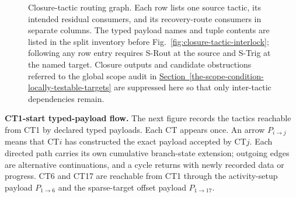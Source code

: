\documentclass[
  11pt,
]{article}
\theoremstyle{definition}
\newcommand{\secref}[1]{\hyperref[#1]{Section~\ref*{#1}}}
\begin{document}
\begin{figure}[p]
{%
}
\caption[Closure-tactic routing graph]{Closure-tactic routing graph.  Each row lists one source tactic, its intended residual consumers, and its recovery-route consumers in separate columns.  The typed payload names and tuple contents are listed in the split inventory before Fig.~\ref{fig:closure-tactic-interlock}; following any row entry requires S-Rout at the source and S-Trig at the named target.  Closure outputs and candidate obstructions referred to the global scope audit in \secref{the-scope-condition-locally-testable-targets} are suppressed here so that only inter-tactic dependencies remain.}
\label{fig:closure-tactic-routing-graph}
\end{figure}

\noindent\textbf{CT1-start typed-payload flow.}
The next figure records the tactics reachable from CT1 by declared
typed payloads.  Each CT appears once.  An arrow \(P_{i\to j}\) means
that CT\(i\) has constructed the exact payload accepted by CT\(j\).
Each directed path carries its own cumulative branch-state extension;
outgoing edges are alternative continuations, and a cycle returns with
newly recorded data or progress. CT6 and CT17 are reachable from
CT1 through the activity-setup payload \(P_{1\to6}\) and the sparse-target
offset payload \(P_{1\to17}\).
\end{document}
